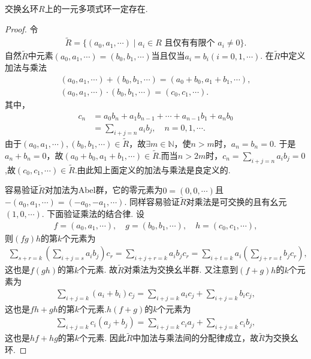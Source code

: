 \documentclass[../../main.tex]{subfiles}%
\begin{document}
\begin{theorem}\label{theorem:抽象代数--定理2.2.1}
交换幺环$R$上的一元多项式环一定存在.
\end{theorem}
\begin{proof}

令
\begin{align*}
\widetilde{R}=\{(a_0,a_1,\cdots)\mid a_i\in R\text{ 且仅有有限个 }a_i\neq 0\}.
\end{align*}
自然$\widetilde{R}$中元素$(a_0,a_1,\cdots)=(b_0,b_1,\cdots)$当且仅当$a_i=b_i(i=0,1,\cdots)$. 在$\widetilde{R}$中定义加法与乘法
\begin{gather}
(a_0,a_1,\cdots)+(b_0,b_1,\cdots)=(a_0+b_0,a_1+b_1,\cdots),\label{eq::::---03j8g4yu46yrsu64wijh2.2.1}\\
(a_0,a_1,\cdots)\cdot(b_0,b_1,\cdots)=(c_0,c_1,\cdots).\label{eq::::---03j8g4yu46yrsu64wijh2.2.2}
\end{gather}
其中，
\begin{align}
c_n&=a_0b_n+a_1b_{n-1}+\cdots+a_{n-1}b_1+a_nb_0\nonumber\\
&=\sum\limits_{i+j=n}a_ib_j,\quad n=0,1,\cdots.\label{eq::::---03j8g4yu46yrsu64wijh2.2.3}
\end{align}
由于$(a_0,a_1,\cdots),(b_0,b_1,\cdots)\in\widetilde{R}$，故$\exists m\in\mathbb{N}$，使$n>m$时，$a_n=b_n=0$. 于是$a_n+b_n=0$，故$(a_0+b_0,a_1+b_1,\cdots)\in \widetilde{R}$.而当$n>2m$时，$c_n=\sum\limits_{i+j=n}a_ib_j=0$,故$(c_0,c_1,\cdots)\in \widetilde{R}$.由此知上面定义的加法与乘法是良定义的.

容易验证$\widetilde{R}$对加法为Abel群，它的零元素为$0=(0,0,\cdots)$且$-(a_0,a_1,\cdots)=(-a_0,-a_1,\cdots)$.
同样容易验证$\widetilde{R}$对乘法是可交换的且有幺元$(1,0,\cdots)$. 下面验证乘法的结合律. 设
\begin{align*}
f=(a_0,a_1,\cdots),\quad g=(b_0,b_1,\cdots),\quad h=(c_0,c_1,\cdots),
\end{align*}
则$(fg)h$的第$k$个元素为
\begin{align*}
\sum\limits_{s+r=k}\left(\sum\limits_{i+j=s}a_ib_j\right)c_r=\sum\limits_{i+j+r=k}a_ib_jc_r
=\sum\limits_{i+t=k}a_i\left(\sum\limits_{j+r=t}b_jc_r\right),
\end{align*}
这也是$f(gh)$的第$k$个元素. 故$\widetilde{R}$对乘法为交换幺半群.
又注意到$(f+g)h$的$k$个元素为
\begin{align*}
\sum_{i+j=k}{\left( a_i+b_i \right) c_j}=\sum_{i+j=k}{a_ic_j}+\sum_{i+j=k}{b_ic_j},
\end{align*}
这也是$fh+gh$的第$k$个元素.$h(f+g)$的$k$个元素为
\begin{align*}
\sum_{i+j=k}{c_i\left( a_j+b_j \right)}=\sum_{i+j=k}{c_ia_j}+\sum_{i+j=k}{c_ib_j},
\end{align*}
这也是$hf+hg$的第$k$个元素.
因此$\widetilde{R}$中加法与乘法间的分配律成立，故$\widetilde{R}$为交换幺环.


\end{proof}
\end{document}
